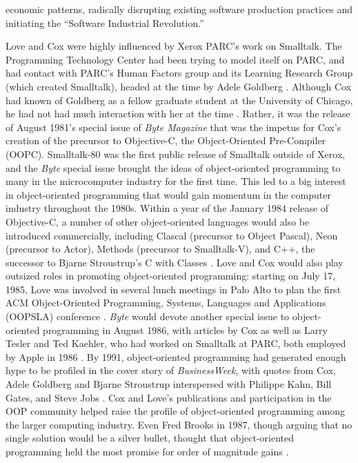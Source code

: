 \documentclass[acmsmall]{acmart}\settopmatter{}
\begin{document}
economic patterns, radically disrupting existing software production practices and initiating the ``Software Industrial Revolution.'' \citep[209--14]{cox_there_1990}

Love and Cox were highly influenced by Xerox PARC's work on Smalltalk. The Programming Technology Center had been trying to model itself on PARC, and had contact with PARC's Human Factors group and its Learning Research Group (which created Smalltalk), headed at the time by Adele Goldberg . Although Cox had known of Goldberg as a fellow graduate student at the University of Chicago, he had not had much interaction with her at the time \citep[9--10]{cox_oral_2016}. Rather, it was the release of August 1981's special issue of \emph{Byte Magazine} \citep{xerox_learning_research_group_smalltalk-80_1981} that was the impetus for Cox's creation of the precursor to Objective-C, the Object-Oriented Pre-Compiler (OOPC). Smalltalk-80 was the first public release of Smalltalk outside of Xerox, and the \emph{Byte} special issue brought the ideas of object-oriented programming to many in the microcomputer industry for the first time. This led to a big interest in object-oriented programming that would gain momentum in the computer industry throughout the 1980s. Within a year of the January 1984 release of Objective-C, a number of other object-oriented languages would also be introduced commercially, including Clascal (precursor to Object Pascal), Neon (precursor to Actor), Methods (precursor to Smalltalk-V), and C++, the successor to Bjarne Stroustrup's C with Classes \citep[41]{love_object_1995}. Love and Cox would also play outsized roles in promoting object-oriented programming: starting on July 17, 1985, Love was involved in several lunch meetings in Palo Alto to plan the first ACM Object-Oriented Programming, Systems, Languages and Applications (OOPSLA) conference \citetext{\citealp[24]{love_object_1995}; }. \emph{Byte} would devote another special issue to object-oriented programming in August 1986, with articles by Cox as well as Larry Tesler and Ted Kaehler, who had worked on Smalltalk at PARC, both employed by Apple in 1986 \citep{cox_objects_1986,kaehler_small_1986,tesler_programming_1986}. By 1991, object-oriented programming had generated enough hype to be profiled in the cover story of \emph{BusinessWeek}, with quotes from Cox, Adele Goldberg and Bjarne Stroustrup interspersed with Philippe Kahn, Bill Gates, and Steve Jobs \citep{verity_software_1991}. Cox and Love's publications and participation in the OOP community helped raise the profile of object-oriented programming among the larger computing industry. Even Fred Brooks in 1987, though arguing that no single solution would be a silver bullet, thought that object-oriented programming held the most promise for order of magnitude gains \citep[14]{brooks_no_1987}.
\end{document}
